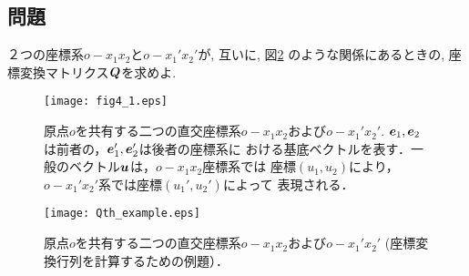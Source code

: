 \documentclass[10pt,a4j]{jarticle}
\begin{document}
\subsection{問題}
２つの座標系$o-x_1x_2$と$o-x_1'x_2'$が, 互いに, 図\ref{fig:Qth_example}
のような関係にあるときの, 座標変換マトリクス$\mbox{\boldmath $Q$}$を求めよ. 
\begin{figure}[h]
	\begin{center}
	\texttt{[image: fig4\_1.eps]} 
	\end{center}
	\caption{原点$o$を共有する二つの直交座標系$o-x_1x_2$および$o-x_1'x_2'$. 
	$\mbox{\boldmath $e$}_1, \mbox{\boldmath $e$}_2$は前者の，$\mbox{\boldmath $e$}_1', \mbox{\boldmath $e$}_2'$は後者の座標系に
	おける基底ベクトルを表す．一般のベクトル$\mbox{\boldmath $u$}$は，$o-x_1x_2$座標系では
	座標$(u_1, u_2)$により，$o-x_1'x_2'$系では座標$(u_1', u_2')$によって
	表現される．}
	\label{fig:fig4_3}
\end{figure}
\begin{figure}[h]
	\begin{center}
	\texttt{[image: Qth\_example.eps]} 
	\end{center}
	\caption{原点$o$を共有する二つの直交座標系$o-x_1x_2$および$o-x_1'x_2'$ 
	(座標変換行列を計算するための例題）．}
	\label{fig:Qth_example}
\end{figure}
\end{document}
